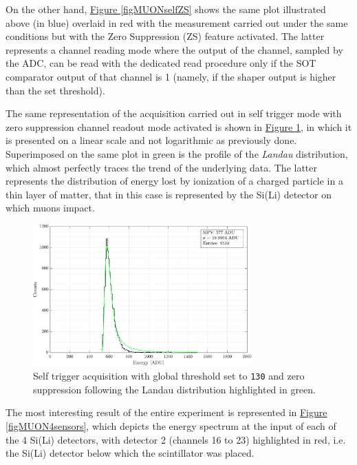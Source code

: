 \par
On the other hand, \hyperref[figMUONselfZS]{Figure \ref{figMUONselfZS}} shows the same plot illustrated above (in blue) overlaid in red with the measurement carried out under the same conditions but with the Zero Suppression (ZS) feature activated. The latter represents a channel reading mode where the output of the channel, sampled by the ADC, can be read with the dedicated read procedure only if the SOT comparator output of that channel is 1 (namely, if the shaper output is higher than the
set threshold).

\par
The same representation of the acquisition carried out in self trigger mode with zero suppression channel readout mode activated is shown in \hyperref[figMUONlandau]{Figure \ref{figMUONlandau}}, in which it is presented on a linear scale and not logarithmic as previously done. Superimposed on the same plot in green is the profile of the \textit{Landau} distribution, which almost perfectly traces the trend of the underlying data. The latter represents the distribution of energy lost by ionization of a charged particle in a thin layer of matter, that in this case is represented by the Si(Li) detector on which muons impact.

\begin{figure}[h!]
    \centering
    \includegraphics[width=0.75\textwidth]{Images/chap3/results/muons/incoming_energy_thr130_ZS_landau.pdf}
    \caption{Self trigger acquisition with global threshold set to \texttt{130} and zero suppression following the Landau distribution highlighted in green.}
    \label{figMUONlandau}
\end{figure}

\par
The most interesting result of the entire experiment is represented in \hyperref[figMUON4sensors]{Figure \ref{figMUON4sensors}}, which depicts the energy spectrum at the input of each of the 4 Si(Li) detectors, with detector 2 (channels 16 to 23) highlighted in red, i.e. the Si(Li) detector below which the scintillator was placed.


